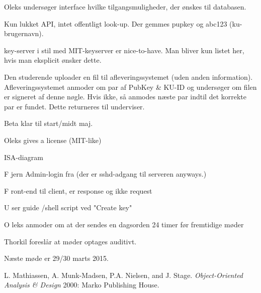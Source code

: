 \documentclass[11pt,a4paper]{report}
\let\OldItem\item
\newcommand{\SubItemStart}[1]{%
    \let\item\SubItemEnd
    \begin{SubItemList}[resume]%
        \OldItem #1%
}
\newcommand{\SubItemMiddle}[1]{%
    \OldItem #1%
}
\newcommand{\SubItemEnd}[1]{%
    \end{SubItemList}%
    \let\item\OldItem
    \item #1%
}
\newcommand*{\SubItem}[1]{%
    \let\SubItem\SubItemMiddle%
    \SubItemStart{#1}%
}%
\begin{document}
\begin{itemize}
\item Oleks undersøger interface hvilke tilgangsmuligheder, der ønskes til databasen.
\item Kun lukket API, intet offentligt look-up. Der gemmes pupkey og abc123 (ku-brugernavn).
\item key-server i stil med MIT-keyserver er nice-to-have. Man bliver kun listet her, hvis man eksplicit ønsker dette.
\item Den studerende uploader en fil til afleveringssystemet (uden anden information). Afleveringssystemet anmoder om par af PubKey \& KU-ID og undersøger om filen er signeret af denne nøgle. Hvis ikke, så anmodes næste par indtil det korrekte par er fundet. Dette returneres til underviser.
\item Beta klar til start/midt maj.
\item Oleks gives a license (MIT-like)
\item ISA-diagram
\SubItem Fjern Admin-login fra (der er sshd-adgang til serveren anyways.)
\SubItem Front-end til client, er response og ikke request
\SubItem User guide /shell script ved "Create key"
\item Oleks anmoder om at der sendes en dagsorden 24 timer før fremtidige møder
\item Thorkil foreslår at møder optages auditivt.
\end{itemize}

Næste møde er 29/30 marts 2015.

\begin{thebibliography}{1}

 L. Mathiassen, A. Munk-Madsen, P.A. Nielsen, and J. Stage. {\em Object-Oriented Analysis \& Design} 2000: Marko Publishing House.




\end{thebibliography}
\end{document}

